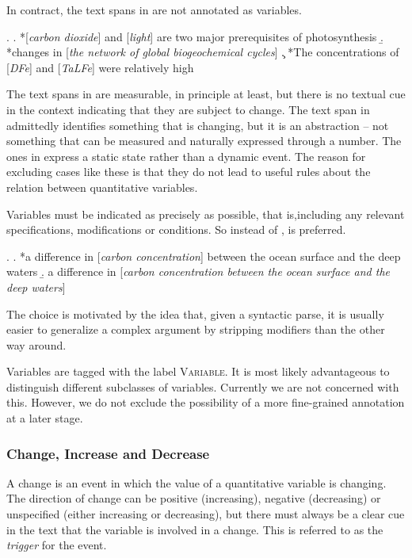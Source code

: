 \documentclass[10pt, a4paper]{article}
\newcommand{\tag}[1]{\textsc{#1}}
\begin{document}
In contract, the text spans in \Next are not annotated as variables.

\ex.
  \a. *[\emph{carbon dioxide}] and [\emph{light}] are two major prerequisites of photosynthesis
  \b. *changes in [\emph{the network of global biogeochemical cycles}] 
  \c. *The concentrations of [\emph{DFe}] and [\emph{TaLFe}] were relatively high

The text spans in \Last[a] are measurable, in principle at least, but there is no textual cue in the context indicating that they are subject to change. 
The text span in \Last[b] admittedly identifies something that is changing, but it is an abstraction -- not something that can be measured and naturally expressed through a number. 
The ones in \Last[c] express a static state rather than a dynamic event.
The reason for excluding cases like these is that they do not lead to useful rules about the relation between quantitative variables.

Variables must be indicated as precisely as possible, that is,including any relevant specifications, modifications or conditions. So instead of \Next[a], \Next[b] is preferred.

\ex.
  \a. *a difference in [\emph{carbon concentration}] between the ocean surface and the deep waters
  \b. a difference in [\emph{carbon concentration between the ocean surface and the deep waters}]

The choice is motivated by the idea that, given a syntactic parse, it is usually easier to generalize a complex argument by stripping modifiers than the other way around.  

Variables are tagged with the label \tag{Variable}. It is most likely advantageous to distinguish different subclasses of variables. Currently we are not concerned with this. 
However, we do not exclude the possibility of a more fine-grained annotation at a later stage. 


\subsubsection{Change, Increase and Decrease}

A change is an event in which the value of a quantitative variable is changing.
The direction of change can be positive (increasing), negative (decreasing) or unspecified (either increasing or decreasing), but there must always be a clear cue in the text that the variable is involved in a change.
This is referred to as the \emph{trigger} for the event.
\end{document}
